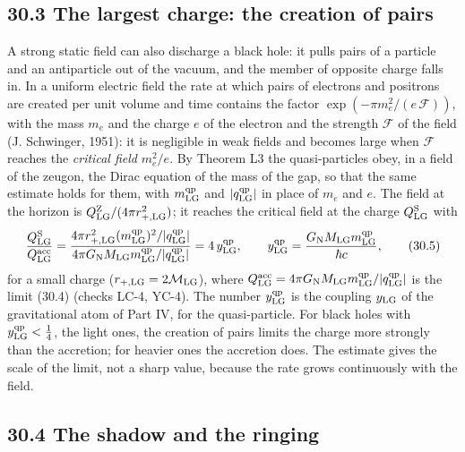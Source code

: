 \documentclass[
  10pt,
]{article}
\begin{document}
\hypertarget{the-largest-charge-the-creation-of-pairs}{%
\subsection{30.3 The largest charge: the creation of
pairs}\label{the-largest-charge-the-creation-of-pairs}}

A strong static field can also discharge a black hole: it pulls pairs of
a particle and an antiparticle out of the vacuum, and the member of
opposite charge falls in. In a uniform electric field the rate at which
pairs of electrons and positrons are created per unit volume and time
contains the factor \(\exp(-\pi m_e^2/(e\,\mathcal F))\), with the mass
\(m_e\) and the charge \(e\) of the electron and the strength
\(\mathcal F\) of the field (J. Schwinger, 1951): it is negligible in
weak fields and becomes large when \(\mathcal F\) reaches the
\emph{critical field} \(m_e^2/e\). By Theorem L3 the quasi-particles
obey, in a field of the zeugon, the Dirac equation of the mass of the
gap, so that the same estimate holds for them, with
\(m^{\rm qp}_{\rm LG}\) and \(\lvert q^{\rm qp}_{\rm LG}\rvert\) in
place of \(m_e\) and \(e\). The field at the horizon is
\(Q^{\rm Z}_{\rm LG}/(4\pi r_{+,\rm LG}^2)\); it reaches the critical
field at the charge \(Q^{\rm S}_{\rm LG}\) with
\[\frac{Q^{\rm S}_{\rm LG}}{Q^{\rm acc}_{\rm LG}}=\frac{4\pi r_{+,\rm LG}^2(m^{\rm qp}_{\rm LG})^2/\lvert q^{\rm qp}_{\rm LG}\rvert}{4\pi G_{\rm N}M_{\rm LG}m^{\rm qp}_{\rm LG}/\lvert q^{\rm qp}_{\rm LG}\rvert}=4\,y^{\rm qp}_{\rm LG},\qquad y^{\rm qp}_{\rm LG}=\frac{G_{\rm N}M_{\rm LG}m^{\rm qp}_{\rm LG}}{\hbar c},\tag{30.5}\]
for a small charge (\(r_{+,\rm LG}=2\mathcal M_{\rm LG}\)), where
\(Q^{\rm acc}_{\rm LG}=4\pi G_{\rm N}M_{\rm LG}m^{\rm qp}_{\rm LG}/\lvert q^{\rm qp}_{\rm LG}\rvert\)
is the limit (30.4) (checks LC-4, YC-4). The number
\(y^{\rm qp}_{\rm LG}\) is the coupling \(y_{\rm LG}\) of the
gravitational atom of Part IV, for the quasi-particle. For black holes
with \(y^{\rm qp}_{\rm LG}<\tfrac14\), the light ones, the creation of
pairs limits the charge more strongly than the accretion; for heavier
ones the accretion does. The estimate gives the scale of the limit, not
a sharp value, because the rate grows continuously with the field.

\hypertarget{the-shadow-and-the-ringing}{%
\subsection{30.4 The shadow and the
ringing}\label{the-shadow-and-the-ringing}}
\end{document}
